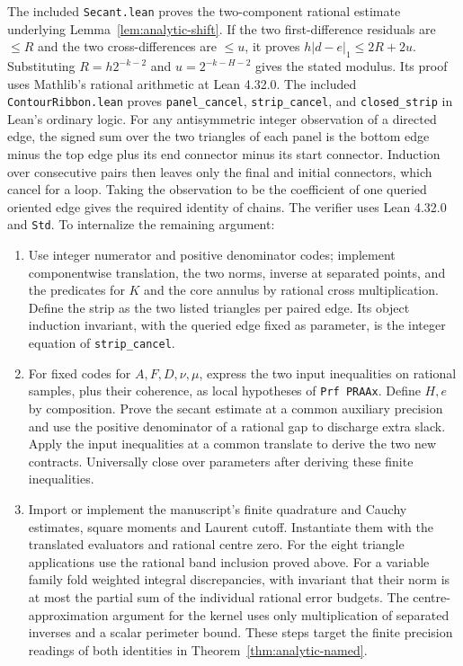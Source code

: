 The included \texttt{Secant.lean} proves the two-component rational
estimate underlying Lemma~\ref{lem:analytic-shift}. If the two
first-difference residuals are $\le R$ and the two cross-differences
are $\le u$, it proves $h|d-e|_1\le2R+2u$. Substituting
$R=h2^{-k-2}$ and $u=2^{-k-H-2}$ gives the stated modulus.
Its proof uses Mathlib's rational arithmetic at Lean 4.32.0.
The included \texttt{ContourRibbon.lean} proves
\texttt{panel\_cancel}, \texttt{strip\_cancel}, and \texttt{closed\_strip}
in Lean's ordinary logic. For any antisymmetric integer observation of
a directed edge, the signed sum over the two triangles of each panel is
the bottom edge minus the top edge plus its end connector minus its
start connector. Induction over consecutive pairs then leaves only
the final and initial connectors, which cancel for a loop. Taking the
observation to be the coefficient of one queried oriented edge gives
the required identity of chains. The verifier uses Lean 4.32.0 and
\texttt{Std}. To internalize the remaining argument:
\begin{enumerate}
\item Use integer numerator and positive denominator codes; implement
      componentwise translation, the two norms, inverse at separated
      points, and the predicates for $K$ and the core annulus by
      rational cross multiplication. Define the strip as the two listed
      triangles per paired edge. Its object induction invariant, with
      the queried edge fixed as parameter, is the integer equation of
      \texttt{strip\_cancel}.
\item For fixed codes for $A,F,D,\nu,\mu$, express the two input
      inequalities on rational samples, plus their coherence, as local
      hypotheses of \texttt{Prf PRAAx}. Define $H,e$ by composition.
      Prove the secant estimate at a common auxiliary precision and use
      the positive denominator of a rational gap to discharge extra
      slack. Apply the input inequalities at a common translate to
      derive the two new contracts. Universally close over parameters
      after deriving these finite inequalities.
\item Import or implement the manuscript's finite quadrature and
      Cauchy estimates, square moments and Laurent cutoff. Instantiate
      them with the translated evaluators and rational centre zero.
      For the eight triangle applications use the rational band
      inclusion proved above. For a variable family fold weighted
      integral discrepancies, with invariant that their norm is at
      most the partial sum of the individual rational error budgets.
      The centre-approximation argument for the kernel uses only
      multiplication of separated inverses and a scalar perimeter
      bound. These steps target the finite precision readings of both
      identities in Theorem~\ref{thm:analytic-named}.
\end{enumerate}
